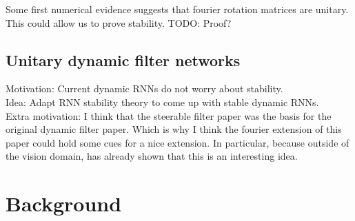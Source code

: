 \documentclass{article}
\begin{document}
Some first numerical evidence suggests that fourier rotation matrices are unitary. This could allow us to prove stability. TODO: Proof?

\subsection{Unitary dynamic filter networks}
Motivation: Current dynamic RNNs do not worry about stability. \\
Idea: Adapt RNN stability theory to come up with stable dynamic RNNs. \\
Extra motivation: I think that the steerable filter paper \cite{Freeman} was the basis for the original dynamic filter paper. Which is why I think the fourier extension of this paper \cite{Michaelis} could hold some cues for a nice extension. In particular, because outside of the vision domain, \cite{Hyland} has already shown that this is an interesting idea. 

\section{Background}
\end{document}
